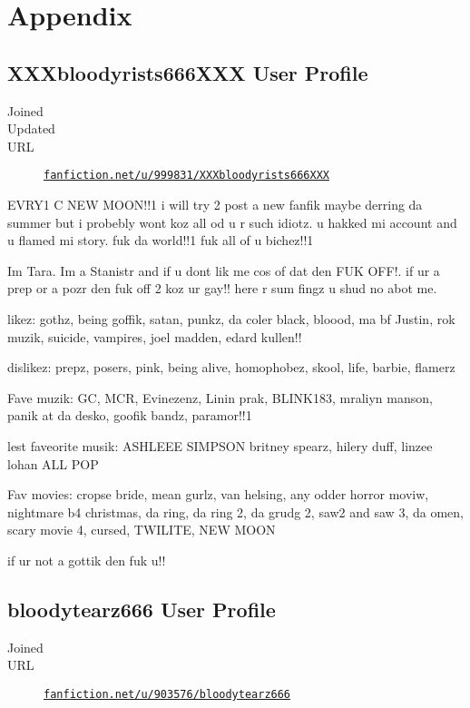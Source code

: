 \cleardoublepage\chapter{Appendix}

\section{XXXbloodyrists666XXX User Profile}
\begin{description}
	\item[Joined] 
	\item[Updated] 
	\item[URL] \href{https://www.fanfiction.net/u/999831/XXXbloodyrists666XXX}{\texttt{fanfiction.net/u/999831/XXXbloodyrists666XXX}}
\end{description}

EVRY1 C NEW MOON!!1 i will try 2 post a new fanfik
maybe derring da summer but i probebly wont koz all
od u r such idiotz. u hakked mi account and u flamed
mi story. fuk da world!!1 fuk all of u bichez!!1

Im Tara. Im a Stanistr and if u dont lik me cos of
dat den FUK OFF!. if ur a prep or a pozr den fuk off
2 koz ur gay!! here r sum fingz u shud no abot me.

likez: gothz, being goffik, satan, punkz, da coler
black, bloood, ma bf Justin, rok muzik, suicide,
vampires, joel madden, edard kullen!!

dislikez: prepz, posers, pink, being alive,
homophobez, skool, life, barbie, flamerz

Fave muzik: GC, MCR, Evinezenz, Linin prak, BLINK183,
mraliyn manson, panik at da desko, goofik bandz, paramor!!1

\begin{sloppypar}
	lest faveorite musik: ASHLEEE SIMPSON britney spearz,
	hilery duff, linzee lohan ALL POP
\end{sloppypar}

Fav movies: cropse bride, mean gurlz, van helsing, any
odder horror moviw, nightmare b4 christmas, da ring,
da ring 2, da grudg 2, saw2 and saw 3, da omen, scary movie 4,
cursed, TWILITE, NEW MOON

if ur not a gottik den fuk u!!

\section{bloodytearz666 User Profile}
\begin{description}
	\item[Joined] 
	\item[URL] \href{https://www.fanfiction.net/u/903576/bloodytearz666}{\texttt{fanfiction.net/u/903576/bloodytearz666}}
\end{description}

